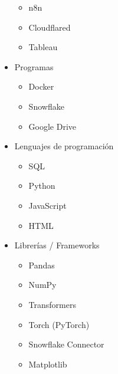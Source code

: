 \documentclass[letterpaper,10pt,spanish]{sphinxmanual}
\begin{document}
\begin{itemize}
\begin{itemize}
\item {} 
\sphinxAtStartPar
n8n

\item {} 
\sphinxAtStartPar
Cloudflared

\item {} 
\sphinxAtStartPar
Tableau

\end{itemize}

\item {} 
\sphinxAtStartPar
Programas
\begin{itemize}
\item {} 
\sphinxAtStartPar
Docker

\item {} 
\sphinxAtStartPar
Snowflake

\item {} 
\sphinxAtStartPar
Google Drive

\end{itemize}

\item {} 
\sphinxAtStartPar
Lenguajes de programación
\begin{itemize}
\item {} 
\sphinxAtStartPar
SQL

\item {} 
\sphinxAtStartPar
Python

\item {} 
\sphinxAtStartPar
JavaScript

\item {} 
\sphinxAtStartPar
HTML

\end{itemize}

\item {} 
\sphinxAtStartPar
Librerías / Frameworks
\begin{itemize}
\item {} 
\sphinxAtStartPar
Pandas

\item {} 
\sphinxAtStartPar
NumPy

\item {} 
\sphinxAtStartPar
Transformers

\item {} 
\sphinxAtStartPar
Torch (PyTorch)

\item {} 
\sphinxAtStartPar
Snowflake Connector

\item {} 
\sphinxAtStartPar
Matplotlib


\end{itemize}
\end{itemize}
\end{document}
